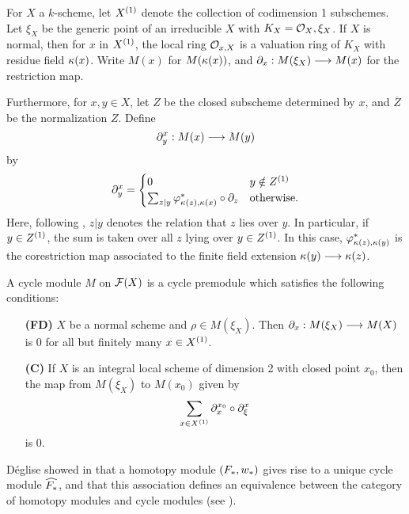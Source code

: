For $X$ a $k$-scheme, let $\subsch{1}{X}$ denote the collection of 
codimension 1 subschemes. Let $\xi_X$ be the generic point of an
irreducible $X$ with $K_X = \O_X,\xi_X$. If $X$ is normal, then 
for $x$ in $\subsch{1}{X}$, the local ring $\O_{x,X}$ is a valuation 
ring of $K_X$ with residue field $\resf{x}$. Write $M(x)$ for 
$M(\resf{x})$, and $\res{x}: M(\xi_X) \to M(x)$ for the 
restriction map.

Furthermore, for $x, y \in X$, let $Z$ be the closed subscheme 
determined by $x$, and $\overline{Z}$ be the normalization $Z$.
Define
\[
\ptres{x}{y}: M(x) \to M(y)
\]
by
\[
\ptres{x}{y} = 
\begin{cases}
0 & y \notin \subsch{1}{Z} \\
\sum_{z|y} \phi_{\resf{z},\resf{x}}^* \comp \res{z} & \textrm{otherwise}.
\end{cases}
\]
Here, following \cite{Rost96}, $z|y$ denotes the relation that $z$ 
lies over $y$. In particular, if $y \in \subsch{1}{Z}$, the sum 
is taken over all $z$ lying over $y \in \subsch{1}{Z}$. In this
case, $\phi_{\resf{z},\resf{y}}^*$ is the corestriction map 
associated to the finite field extension $\resf{y} \to \resf{z}$.

\begin{defn}
A cycle module $M$ on $\fields(X)$ is a cycle premodule which
satisfies the following conditions:

\begin{enumerate}[leftmargin=3em]
\item[\textbf{(FD)}]  
$X$ be a normal scheme and $\rho \in M(\xi_X)$. Then $\res{x}: 
M(\xi_X) \to M(X)$ is 0 for all but finitely many $x \in 
\subsch{1}{X}$.

\item[\textbf{(C)}]  If $X$ is an integral
local scheme of dimension 2 with closed point $x_0$, then the map 
from $M(\xi_X)$ to $M(x_0)$ given by
\[
\sum_{x \in \subsch{1}{X}} \ptres{x_0}{x} \comp \ptres{x}{\xi}
\]
is 0.
\end{enumerate}
\end{defn}

D\'eglise showed in \cite{DegModHom} that a homotopy module $(F_*, 
\deloop_*)$ gives rise to a unique cycle module $\assocCM{F_*}$,
and that this association defines an equivalence between the 
category of homotopy modules and cycle modules (see 
\cite[3.7]{DegModHom}).

